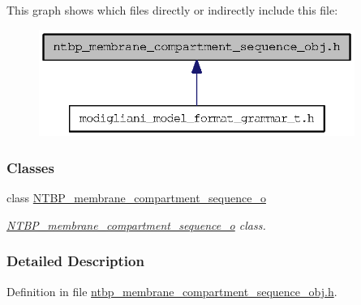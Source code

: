 This graph shows which files directly or indirectly include this file:
\nopagebreak
\begin{figure}[H]
\begin{center}
\leavevmode
\includegraphics[width=292pt]{ntbp__membrane__compartment__sequence__obj_8h__dep__incl}
\end{center}
\end{figure}
\subsubsection*{Classes}
\begin{DoxyCompactItemize}
\item 
class \hyperlink{class_n_t_b_p__membrane__compartment__sequence__o}{NTBP\_\-membrane\_\-compartment\_\-sequence\_\-o}
\begin{DoxyCompactList}\small\item\em \hyperlink{class_n_t_b_p__membrane__compartment__sequence__o}{NTBP\_\-membrane\_\-compartment\_\-sequence\_\-o} class. \item\end{DoxyCompactList}\end{DoxyCompactItemize}


\subsubsection{Detailed Description}


Definition in file \hyperlink{ntbp__membrane__compartment__sequence__obj_8h_source}{ntbp\_\-membrane\_\-compartment\_\-sequence\_\-obj.h}.

